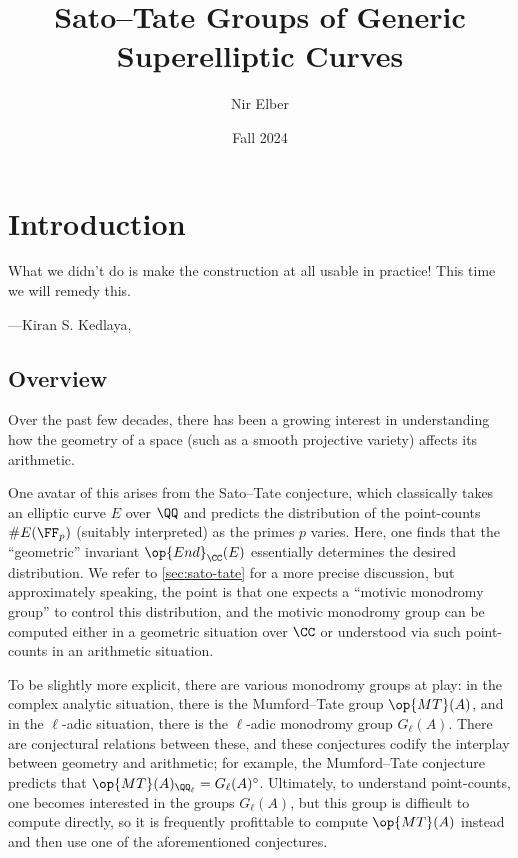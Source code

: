 \documentclass[openany]{book}
\title{Sato--Tate Groups of Generic Superelliptic Curves}
\author{Nir Elber}
\date{Fall 2024}
\begin{document}
\maketitle

\nirtableofcontents

\newpage

\setcounter{chapter}{-1}
\chapter{Introduction}

\epigraph{What we didn't do is make the construction at all usable in practice! This time we will remedy this.}
{---Kiran S. Kedlaya, \cite{kedlaya-cft}}

\section{Overview}
Over the past few decades, there has been a growing interest in understanding how the geometry of a space (such as a smooth projective variety) affects its arithmetic.

One avatar of this arises from the Sato--Tate conjecture, which classically takes an elliptic curve $E$ over $\QQ$ and predicts the distribution of the point-counts $\#E(\FF_p)$ (suitably interpreted) as the primes $p$ varies. Here, one finds that the ``geometric'' invariant $\op{End}_\CC(E)$ essentially determines the desired distribution. We refer to \cref{sec:sato-tate} for a more precise discussion, but approximately speaking, the point is that one expects a ``motivic monodromy group'' to control this distribution, and the motivic monodromy group can be computed either in a geometric situation over $\CC$ or understood via such point-counts in an arithmetic situation.

To be slightly more explicit, there are various monodromy groups at play: in the complex analytic situation, there is the Mumford--Tate group $\op{MT}(A)$, and in the $\ell$-adic situation, there is the $\ell$-adic monodromy group $G_\ell(A)$. There are conjectural relations between these, and these conjectures codify the interplay between geometry and arithmetic; for example, the Mumford--Tate conjecture predicts that $\op{MT}(A)_{\QQ_\ell}=G_\ell(A)^\circ$. Ultimately, to understand point-counts, one becomes interested in the groups $G_\ell(A)$, but this group is difficult to compute directly, so it is frequently profittable to compute $\op{MT}(A)$ instead and then use one of the aforementioned conjectures.
\end{document}
